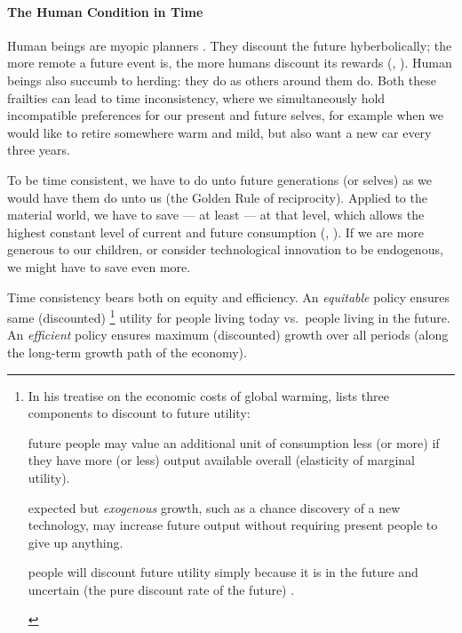 \paragraph{The Human Condition in Time}
Human beings are myopic planners \citep{KahnemanTversky1979}.
They discount the future hyberbolically;
the more remote a future event is, the more humans discount its rewards (\citealt{Ainslie1975}, \citealt{Thaler1981}).
Human beings also succumb to herding:
they do as others around them do.
Both these frailties can lead to time inconsistency, where we simultaneously hold incompatible preferences for our present and future selves, for example when we would like to retire somewhere warm and mild, but also want a new car every three years.

To be time consistent, we have to do unto future generations (or selves) as we would have them do unto us (the Golden Rule of reciprocity).
Applied to the material world, we have to save --- at least --- at that level, which allows the highest constant level of current and future consumption (\citealt{Phelps1966a}, \citealt{Solow1956}).
If we are more generous to our children, or consider technological innovation to be endogenous, we might have to save even more.

Time consistency bears both on equity and efficiency.
An \emph{equitable} policy ensures same (discounted)
\footnote{
	\label{fn:3components}
	In his treatise on the economic costs of global warming, \citeauthor{Stern-2006-aa} lists three components to discount to future utility:
	\begin{inparaenum}[\itshape 1\upshape)]
		\item future people may value an additional unit of consumption less (or more) if they have more (or less) output available overall (elasticity of marginal utility).
		\item expected but \emph{exogenous} growth, such as a chance discovery of a new technology, may increase future output without requiring present people to give up anything.
		\item people will discount future utility simply because it is in the future and uncertain (the pure discount rate of the future) \citep[52]{Stern-2006-aa}.
	\end{inparaenum}
}
utility for people living today vs.\ people living in the future.
An \emph{efficient} policy ensures maximum (discounted) growth over all periods (along the long-term growth path of the economy).


